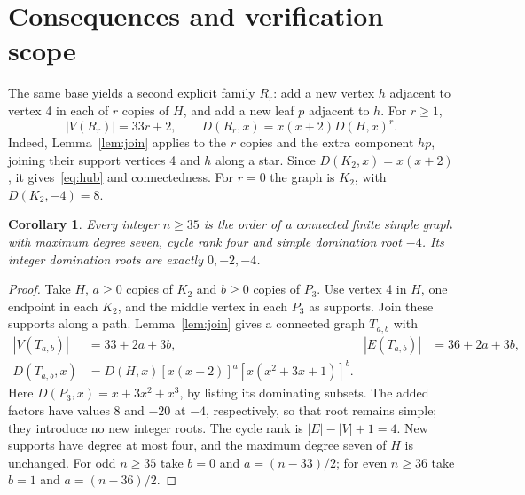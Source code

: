 \documentclass[11pt]{article}
\newtheorem{corollary}[theorem]{Corollary}
\newcommand{\base}{H}
\begin{document}
\section{Consequences and verification scope}
The same base yields a second explicit family $R_r$: add a new vertex
$h$ adjacent to vertex 4 in each of $r$ copies of $\base$, and add a
new leaf $p$ adjacent to $h$. For $r\geq1$,
\begin{equation}\label{eq:hub}
 |V(R_r)|=33r+2,\qquad D(R_r,x)=x(x+2)D(\base,x)^r.
\end{equation}
Indeed, Lemma~\ref{lem:join} applies to the $r$ copies and the extra
component $hp$, joining their support vertices 4 and $h$ along a star.
Since $D(K_2,x)=x(x+2)$, it gives~\eqref{eq:hub} and connectedness.
For $r=0$ the graph is $K_2$, with $D(K_2,-4)=8$.

\begin{corollary}\label{cor:orders}
Every integer $n\geq35$ is the order of a connected finite simple graph
with maximum degree seven, cycle rank four and simple domination root
$-4$. Its integer domination roots are exactly $0,-2,-4$.
\end{corollary}
\begin{proof}
Take $\base$, $a\geq0$ copies of $K_2$ and $b\geq0$ copies of $P_3$.
Use vertex 4 in $\base$, one endpoint in each $K_2$, and the middle
vertex in each $P_3$ as supports. Join these supports along a path.
Lemma~\ref{lem:join} gives a connected graph $T_{a,b}$ with
\begin{align*}
 |V(T_{a,b})|&=33+2a+3b, & |E(T_{a,b})|&=36+2a+3b,\\
 D(T_{a,b},x)&=D(\base,x)[x(x+2)]^a[x(x^2+3x+1)]^b.
\end{align*}
Here $D(P_3,x)=x+3x^2+x^3$, by listing its dominating subsets.
The added factors have values 8 and $-20$ at $-4$, respectively,
so that root remains simple; they introduce no new integer roots.
The cycle rank is $|E|-|V|+1=4$.
New supports have degree at most four, and the maximum degree seven
of $\base$ is unchanged.
For odd $n\geq35$ take $b=0$ and $a=(n-33)/2$; for even $n\geq36$
take $b=1$ and $a=(n-36)/2$.
\end{proof}
\end{document}
